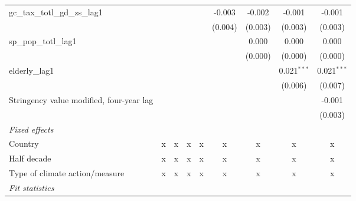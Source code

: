 \begin{tabular}{lcccccccc}
   gc\_tax\_totl\_gd\_zs\_lag1                               &                &                &                &                & -0.003        & -0.002        & -0.001        & -0.001\\   
                                                             &                &                &                &                & (0.004)       & (0.003)       & (0.003)       & (0.003)\\   
   sp\_pop\_totl\_lag1                                       &                &                &                &                &               & 0.000         & 0.000         & 0.000\\   
                                                             &                &                &                &                &               & (0.000)       & (0.000)       & (0.000)\\   
   elderly\_lag1                                             &                &                &                &                &               &               & 0.021$^{***}$ & 0.021$^{***}$\\   
                                                             &                &                &                &                &               &               & (0.006)       & (0.007)\\   
   Stringency value modified, four-year lag                  &                &                &                &                &               &               &               & -0.001\\   
                                                             &                &                &                &                &               &               &               & (0.003)\\   
   \emph{Fixed effects}\\
   Country                                                   & x              & x              & x              & x              & x             & x             & x             & x\\  
   Half decade                                               & x              & x              & x              & x              & x             & x             & x             & x\\  
   Type of climate action/measure                            & x              & x              & x              & x              & x             & x             & x             & x\\  
   \midrule \emph{Fit statistics}\\

\end{tabular}
